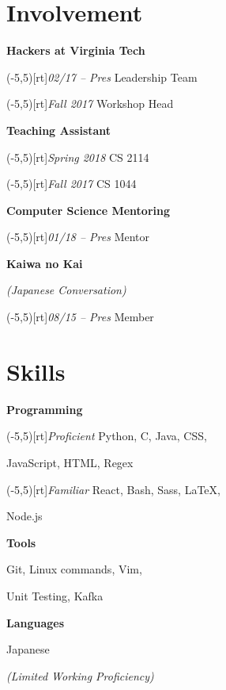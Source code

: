\documentclass[9pt]{extarticle}
\newcommand{\sidebox}[1]{\makebox(-5,5)[rt]{#1}}
\newcommand{\sidenote}[1]{\scriptsize\color{info}\textit{#1}}
\newcommand{\Subsection}[2]{
    {\normalsize\color{subsection}\textbf{#1}}
    \begin{trivlist}
        \color{bullet}
        #2
    \end{trivlist}
}
\newcommand{\ChronoItem}[2]{
    \item
    \sidebox{\sidenote{#2}}%
    \color{bullet}#1
}
\newcommand{\InfoItem}[1]{
    \item
    \color{info}\textit{(#1)}
}
\newcommand{\vsubspace}{\vspace{1.5em}}
\newcommand{\vsmallspace}{\vspace{1em}}
\newcommand{\vrightspace}{\vfill}
\begin{document}
\begin{paracol}{2}
\begin{rightcolumn}
        \section{Involvement}
            \Subsection{Hackers at Virginia Tech}{
                \ChronoItem{Leadership Team}{02/17 – Pres}
                \ChronoItem{Workshop Head}{Fall 2017}
            }
            \vsmallspace
            \Subsection{Teaching Assistant}{
                \ChronoItem{CS 2114}{Spring 2018}
                \ChronoItem{CS 1044}{Fall 2017}
            }
            \vsmallspace
            \Subsection{Computer Science Mentoring}{
                \ChronoItem{Mentor}{01/18 – Pres}
            }
            \vsmallspace
            \Subsection{Kaiwa no Kai}{
                \InfoItem{Japanese Conversation}
                \ChronoItem{Member}{08/15 – Pres}
            }
        \vrightspace
        \section{Skills}
            \Subsection{Programming}{
                \ChronoItem{Python, C, Java, CSS,}{Proficient}
                \item JavaScript, HTML, Regex
                \ChronoItem{React, Bash, Sass, LaTeX,}{Familiar}
                \item Node.js
            }
            \vsubspace
            \Subsection{Tools}{
                \item Git, Linux commands, Vim,
                \item Unit Testing, Kafka
            }
            \vsubspace
            \Subsection{Languages}{
                \item Japanese
                \InfoItem{Limited Working Proficiency}
            }
    \end{rightcolumn}
\end{paracol}
\end{document}

